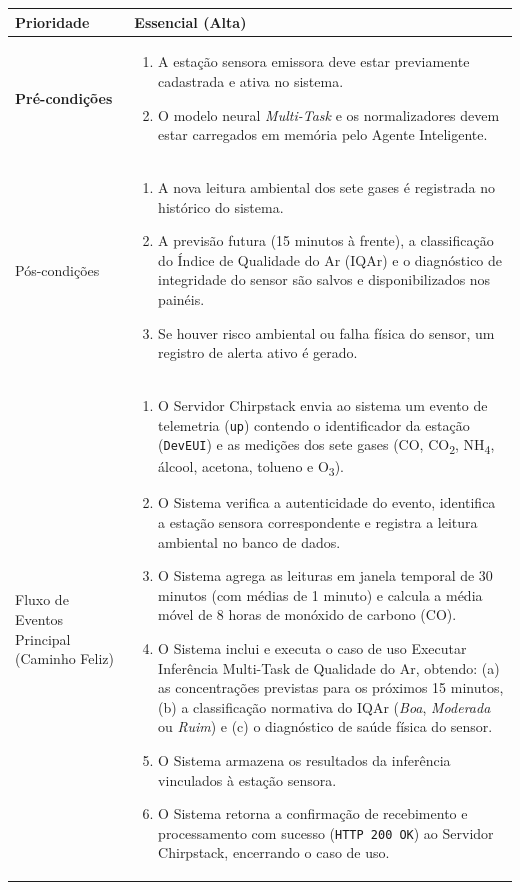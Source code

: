 \documentclass[11pt, a4paper]{article}
\begin{document}
\begin{longtable}{|>{\bfseries}p{3.8cm}|p{12.2cm}|}
Prioridade & \textbf{Essencial (Alta)} \\ \hline

Pré-condições & 
\begin{enumerate}[nosep, leftmargin=0.5cm]
    \item A estação sensora emissora deve estar previamente cadastrada e ativa no sistema.
    \item O modelo neural \emph{Multi-Task} e os normalizadores devem estar carregados em memória pelo Agente Inteligente.
\end{enumerate} \\ \hline

Pós-condições & 
\begin{enumerate}[nosep, leftmargin=0.5cm]
    \item A nova leitura ambiental dos sete gases é registrada no histórico do sistema.
    \item A previsão futura (15 minutos à frente), a classificação do Índice de Qualidade do Ar (IQAr) e o diagnóstico de integridade do sensor são salvos e disponibilizados nos painéis.
    \item Se houver risco ambiental ou falha física do sensor, um registro de alerta ativo é gerado.
\end{enumerate} \\ \hline

Fluxo de Eventos Principal (Caminho Feliz) & 
\begin{enumerate}[nosep, leftmargin=0.5cm]
    \item O Servidor Chirpstack envia ao sistema um evento de telemetria (\texttt{up}) contendo o identificador da estação (\texttt{DevEUI}) e as medições dos sete gases (CO, CO\textsubscript{2}, NH\textsubscript{4}, álcool, acetona, tolueno e O\textsubscript{3}).
    \item O Sistema verifica a autenticidade do evento, identifica a estação sensora correspondente e registra a leitura ambiental no banco de dados.
    \item O Sistema agrega as leituras em janela temporal de 30 minutos (com médias de 1 minuto) e calcula a média móvel de 8 horas de monóxido de carbono (CO).
    \item O Sistema inclui e executa o caso de uso Executar Inferência Multi-Task de Qualidade do Ar, obtendo: (a) as concentrações previstas para os próximos 15 minutos, (b) a classificação normativa do IQAr (\emph{Boa}, \emph{Moderada} ou \emph{Ruim}) e (c) o diagnóstico de saúde física do sensor.
    \item O Sistema armazena os resultados da inferência vinculados à estação sensora.
    \item O Sistema retorna a confirmação de recebimento e processamento com sucesso (\texttt{HTTP 200 OK}) ao Servidor Chirpstack, encerrando o caso de uso.
\end{enumerate} \\ \hline


\end{longtable}
\end{document}
